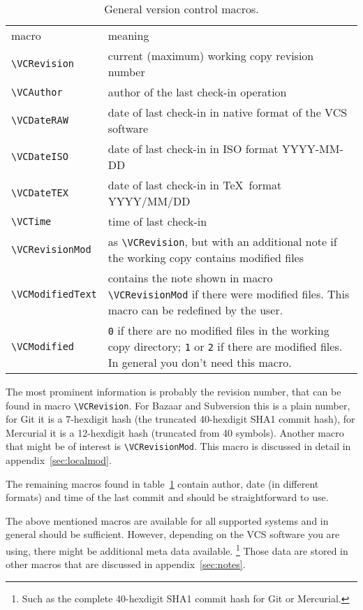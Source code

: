 \documentclass[11pt]{article}
\begin{document}
\begin{table}
  \centering\small
  \begin{tabularx}{\textwidth}{l>{\raggedright\arraybackslash}X}
    macro & meaning\\\addlinespace \toprule\addlinespace
    \verb+\VCRevision+    & current (maximum) working copy revision number\\
    \verb+\VCAuthor+      & author of the last check-in operation\\
    \verb+\VCDateRAW+     & date of last check-in in native format of the VCS software\\
    \verb+\VCDateISO+     & date of last check-in in ISO format YYYY-MM-DD\\
    \verb+\VCDateTEX+     & date of last check-in in \TeX\ format YYYY/MM/DD\\
    \verb+\VCTime+        & time of last check-in\\
    \verb+\VCRevisionMod+ & as \verb+\VCRevision+, but with an additional note if the working copy contains modified files\\
    \verb+\VCModifiedText+& contains the note shown in macro \verb+\VCRevisionMod+ if there were modified files.  This macro can be redefined by the user.\\
    \verb+\VCModified+    & \verb+0+ if there are no modified files in the working copy directory; \verb+1+ or \verb+2+ if there are modified files.  In general you don't need this macro.\\
  \end{tabularx}
  \caption{General version control macros.}
  \label{tab:vcmacros}
\end{table}

The most prominent information is probably the revision number, that can
be found in macro \verb+\VCRevision+.  For Bazaar and Subversion this is
a plain number, for Git it is a 7-hexdigit hash (the truncated
40-hexdigit SHA1 commit hash), for Mercurial it is a 12-hexdigit hash (truncated from 40 symbols).  Another macro that might be of interest
is \verb+\VCRevisionMod+.  This macro is discussed in detail in
appendix~\ref{sec:localmod}.

The remaining macros found in table~\ref{tab:vcmacros} contain author,
date (in different formats) and time of the last commit and should be
straightforward to use.

The above mentioned macros are available for all supported systems and
in general should be sufficient.  However, depending on the VCS software
you are using, there might be additional meta data available.%
\footnote{Such as the complete 40-hexdigit SHA1 commit hash for Git or Mercurial.}
Those data are stored in other macros that are discussed in
appendix~\ref{sec:notes}.
\end{document}
